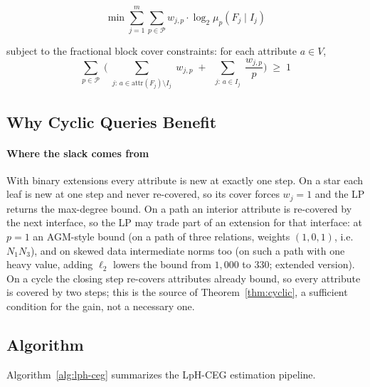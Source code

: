 \documentclass[conference]{IEEEtran}
\newcommand{\block}{F}
\newcommand{\interface}{I}
\newcommand{\muLp}[3]{\mu_{#1}(#2 \mid #3)}
\newcommand{\attr}[1]{\text{attr}(#1)}
\begin{document}
\begin{equation}
\label{eq:lp}
\min \sum_{j=1}^{m} \sum_{p \in \mathcal{P}}
w_{j,p} \cdot \log_2 \muLp{p}{\block_j}{\interface_j}
\end{equation}

subject to the fractional block cover constraints: for each
attribute $a \in V$,
\begin{equation}
\label{eq:cover}
\sum_{p \in \mathcal{P}}\;\Biggl(
\sum_{\substack{j:\, a \in \attr{\block_j} \setminus \interface_j}}
\!\!\! w_{j,p}
\;+\;
\sum_{\substack{j:\, a \in \interface_j}}
\frac{w_{j,p}}{p}
\Biggr)
\;\ge\; 1
\end{equation}

\subsection{Why Cyclic Queries Benefit}\label{sec:whycyclic}

\paragraph{Where the slack comes from}
With binary extensions every attribute is new at exactly one step. On a star each leaf is new at one step and never re-covered, so its cover forces $w_j{=}1$ and the LP returns the max-degree bound. On a path an interior attribute is
re-covered by the next interface, so the LP may trade part of an
extension for that interface: at $p{=}1$ an AGM-style bound (on a path of three relations,
weights $(1,0,1)$, i.e.\ $N_1N_3$), and on skewed data intermediate norms
too (on such a path with one heavy value, adding $\ell_2$ lowers the bound
from $1{,}000$ to $330$; extended version). On a cycle the closing step re-covers attributes already bound, so
every attribute is covered by two steps; this is
the source of Theorem~\ref{thm:cyclic}, a sufficient condition for the gain, not a necessary one.

\subsection{Algorithm}

Algorithm~\ref{alg:lph-ceg} summarizes the LpH-CEG estimation pipeline.
\end{document}

